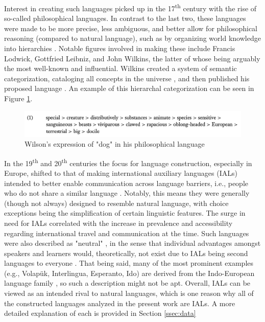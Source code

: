 \documentclass[12pt,a4paper]{article}
\numberwithin{figure}{section}
\numberwithin{table}{section}
\numberwithin{definition}{section}
\begin{document}
Interest in creating such languages picked up in the 17\textsuperscript{th} century with the rise of so-called philosophical languages. In contrast to the last two, these languages were made to be more precise, less ambiguous, and better allow for philosophical reasoning (compared to natural language), such as by organizing world knowledge into hierarchies \parencite{goodall2022article}. Notable figures involved in making these include Francis Lodwick, Gottfried Leibniz, and John Wilkins, the latter of whose being arguably the most well-known and influential. Wilkins created a system of semantic categorization, cataloging all concepts in the universe \parencite{okrent2009book}, and then published his proposed language \parencite{Wilkins1968book}. An example of this hierarchal categorization can be seen in Figure \ref{fig:wilsonslanguageexample}.


\begin{figure}
  \centering
        \includegraphics[width=1.0\textwidth]{./Other/WilsonsLanguageExample.png}
        \caption{Wilson's expression of "dog" in his philosophical language \parencite{goodall2022article}}
        \label{fig:wilsonslanguageexample}
\end{figure}


In the 19\textsuperscript{th} and 20\textsuperscript{th} centuries the focus for language construction, especially in Europe, shifted to that of making international auxiliary languages (IALs) intended to better enable communication across language barriers, i.e., people who do not share a similar language \parencite{goodall2022article}. Notably, this means they were generally (though not always) designed to resemble natural language, with choice exceptions being the simplification of certain linguistic features. The surge in need for IALs correlated with the increase in prevalence and accessibility regarding international travel and communication at the time. Such languages were also described as "neutral" \parencite{Large1985book}, in the sense that individual advantages amongst speakers and learners would, theoretically, not exist due to IALs being second languages to everyone \parencite{Gobbo2016article}. That being said, many of the most prominent examples (e.g., Volapük, Interlingua, Esperanto, Ido) are derived from the Indo-European language family \parencite{Novikov2022article,goodall2022article}, so such a description might not be apt. Overall, IALs can be viewed as an intended rival to natural languages, which is one reason why all of the constructed languages analyzed in the present work are IALs. A more detailed explanation of each is provided in Section \ref{ssec:data}
\end{document}
